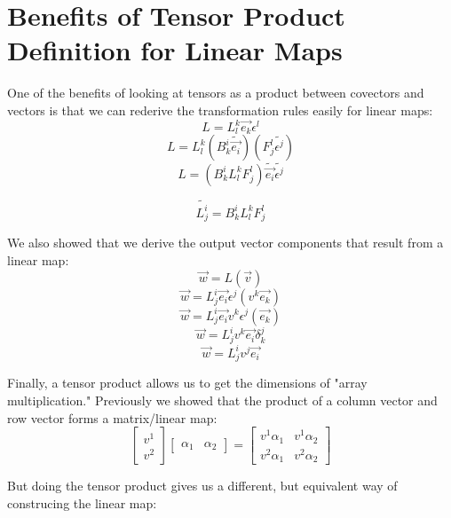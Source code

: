 \documentclass{report}
\begin{document}
\section{Benefits of Tensor Product Definition for Linear Maps}

One of the benefits of looking at tensors as a product between covectors and vectors is that we can rederive the transformation rules easily for linear maps:
$$ L = L_l^k \vec{e_k} \epsilon^l $$ 
$$ L = L_l^k \left( B_k^i \widetilde{\vec{e_i}} \right) \left( F_j^l \widetilde{\epsilon^j} \right) $$ 
$$ L = \left( B_k^i L_l^k F_j^l \right) \widetilde{\vec{e_i} } \widetilde{\epsilon^j}$$ 

$$ \widetilde{L_j^i} = B_k^i L_l^k F_j^l $$ 

We also showed that we derive the output vector components that result from a linear map:
$$ \vec{w } = L\left( \vec{v} \right) $$ 
$$ \vec{w} = L_j^i \vec{e_i} \epsilon^j \left( v^k \vec{e_k }\right)$$ 
$$ \vec{w} = L_j^i \vec{e_i}v^k \epsilon^j\left( \vec{e_k} \right)  $$ 
$$ \vec{w} = L_j^i v^k \vec{e_i} \delta_k^j $$
$$ \vec{w} = L_j^i v^j \vec{e_i}  $$ 

Finally, a tensor product allows us to get the dimensions of "array multiplication." Previously we showed that the product of a column vector and row vector forms a matrix/linear map:
$$ \begin{bmatrix} v^1 \\ v^2 \end{bmatrix} \begin{bmatrix} \alpha_1 & \alpha_2 \end{bmatrix} = \begin{bmatrix} v^1 \alpha_1 & v^1 \alpha_2 \\ v^2 \alpha_1 & v^2 \alpha_2 \end{bmatrix}  $$ 

But doing the tensor product gives us a different, but equivalent way of construcing the linear map:
\end{document}
